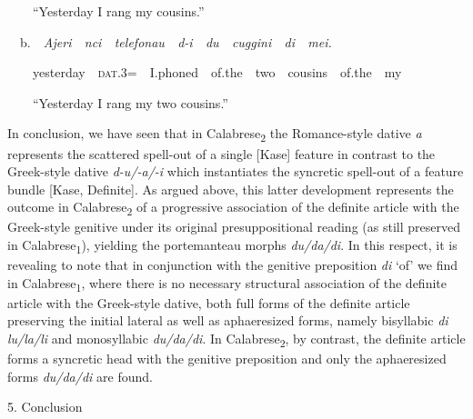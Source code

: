 \documentclass[output=paper,modfonts,nonflat]{langsci/langscibook}
\begin{document}
\begin{styleStandard}
\ \ \ \ “Yesterday I rang my cousins.”
\end{styleStandard}

\begin{styleStandard}
\ \ b.\ \ \textit{Ajeri\ \ nci\ \ telefonau\ \ d-i\ \ du\ \ cuggini\ \ di\ \ mei.}
\end{styleStandard}

\begin{styleStandard}
\ \ \ \ yesterday\ \ \textsc{dat}.3=\ \ I.phoned\ \ of.the\ \ two\ \ cousins\ \ of.the\ \ my
\end{styleStandard}

\begin{styleStandard}
\ \ \ \ “Yesterday I rang my two cousins.”
\end{styleStandard}

\begin{styleStandard}
In conclusion, we have seen that in Calabrese\textsubscript{2} the Romance-style dative \textit{a} represents the scattered spell-out of a single [Kase] feature in contrast to the Greek-style dative \textit{d-u/-a/-i} which instantiates the syncretic spell-out of a feature bundle [Kase, Definite]. As argued above, this latter development represents the outcome in Calabrese\textsubscript{2} of a progressive association of the definite article with the Greek-style genitive under its original presuppositional reading (as still preserved in Calabrese\textsubscript{1}), yielding the portemanteau morphs \textit{du/da/di}. In this respect, it is revealing to note that in conjunction with the genitive preposition \textit{di }‘of’ we find in Calabrese\textsubscript{1}, where there is no necessary structural association of the definite article with the Greek-style dative, both full forms of the definite article preserving the initial lateral as well as aphaeresized forms, namely bisyllabic \textit{di lu/la/li }and monosyllabic \textit{du/da/di}. In Calabrese\textsubscript{2}, by contrast, the definite article forms a syncretic head with the genitive preposition and only the aphaeresized forms \textit{du/da/di} are found.
\end{styleStandard}

\begin{styleStandard}
5. Conclusion
\end{styleStandard}
\end{document}
